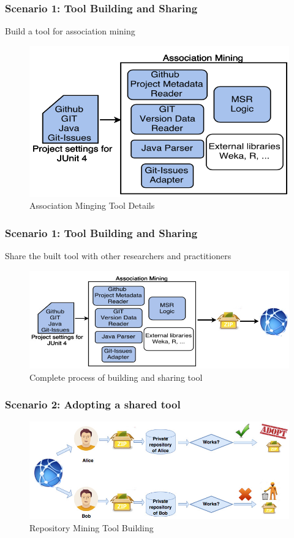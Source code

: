         \begin{frame}
            \frametitle{Scenario 1: Tool Building and Sharing}
            Build a tool for association mining
            \begin{figure}
                \centering
                \includegraphics[width=0.60\linewidth]{figures/association.png}
                \caption{Association Minging Tool Details}
            \end{figure}
        \end{frame}

        \begin{frame}
            \frametitle{Scenario 1: Tool Building and Sharing}
            Share the built tool with other researchers and practitioners
            \begin{figure}
                \centering
                \includegraphics[width=0.85\linewidth]{figures/junitsharing.jpg}
                \caption{Complete process of building and sharing tool}
            \end{figure}
        \end{frame}

        \begin{frame}
            \frametitle{Scenario 2: Adopting a shared tool}
            \begin{figure}
                \centering
                \includegraphics[scale=0.35]{figures/adopting.jpg}
                \caption{Repository Mining Tool Building}
            \end{figure}
        \end{frame}

